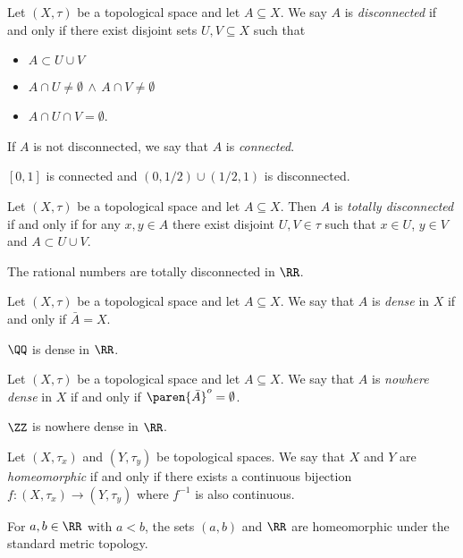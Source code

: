 \begin{definition*}
	Let $(X,\tau)$ be a topological space and let $A\subseteq X$.
	We say $A$ is \textit{disconnected} if and only if there exist disjoint sets $U,V\subseteq X$ such that
	\begin{itemize}
		\item $A\subset U\cup V$
		\item $A\cap U\neq\emptyset\,\wedge\, A\cap V\neq\emptyset$
		\item $A\cap U\cap V=\emptyset$.
	\end{itemize}
	If $A$ is not disconnected, we say that $A$ is \textit{connected}.
\end{definition*}
\begin{example*}
	$[0,1]$ is connected and $(0,1/2)\cup(1/2,1)$ is disconnected.
\end{example*}

\begin{definition*}
	Let $(X,\tau)$ be a topological space and let $A\subseteq X$.
	Then $A$ is \textit{totally disconnected} if and only if for any $x,y\in A$ there exist disjoint $U,V\in\tau$ such that $x\in U$, $y\in V$ and $A\subset U\cup V$.
\end{definition*}
\begin{example*}
	The rational numbers are totally disconnected in $\RR$.
\end{example*}

\begin{definition*}
	Let $(X,\tau)$ be a topological space and let $A\subseteq X$.
	We say that $A$ is \textit{dense} in $X$ if and only if $\bar{A}=X$.
\end{definition*}
\begin{example*}
	$\QQ$ is dense in $\RR$.
\end{example*}

\begin{definition*}
	Let $(X,\tau)$ be a topological space and let $A\subseteq X$.
	We say that $A$ is \textit{nowhere dense} in $X$ if and only if $\paren{\bar{A}}^o=\emptyset$.
\end{definition*}
\begin{example*}
	$\ZZ$ is nowhere dense in $\RR$.
\end{example*}

\begin{definition*}
	Let $(X,\tau_x)$ and $(Y,\tau_y)$ be topological spaces.
	We say that $X$ and $Y$ are \textit{homeomorphic} if and only if there exists a continuous bijection $f:(X,\tau_x)\rightarrow(Y,\tau_y)$ where $f^{-1}$ is also continuous.
\end{definition*}
\begin{example*}
	For $a,b\in\RR$ with $a<b$, the sets $(a,b)$ and $\RR$ are homeomorphic under the standard metric topology.
\end{example*}

